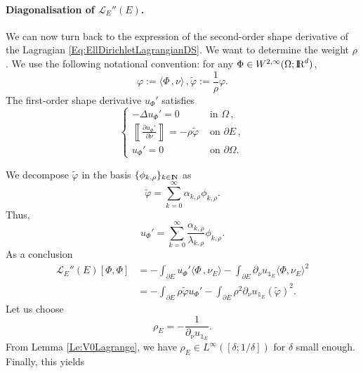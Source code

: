 \documentclass{article}
\newcommand{\R}{\textnormal{I\kern-0.21emR}}
\newcommand{\N}{\textnormal{I\kern-0.21emN}}
\def\O{{\Omega}}
\def\p{{\varphi}}
\numberwithin{equation}{section}
\begin{document}
\paragraph{Diagonalisation of $\mathscr L_{E}''(E)$.}
We can now turn back to the expression of the second-order shape derivative of the Lagragian \eqref{Eq:EllDirichletLagrangianDS}. We want to determine the weight $\rho$. We use the following notational convention: for any $\Phi \in W^{2,\infty}(\O;\R^d)$,
 \[\p:=\langle \Phi\,, \nu\rangle\,, \tilde\p:=\frac1{\rho} \p.\] The first-order shape derivative $u_\Phi'$ satisfies
\begin{equation}\label{Eq:Chop}
\begin{cases}
-\Delta u_\Phi'=0&\text{ in }\O\,, 
\\\left\llbracket\frac{\partial u_\Phi'}{\partial \nu}\right\rrbracket=-\rho \tilde \p&\text{ on }\partial E\,, 
\\ u_\Phi'=0&\text{ on }\partial \O.\end{cases}\end{equation} %
%
%

 We decompose $\tilde \p$ in the basis $\{\phi_{k,\rho}\}_{k\in \N}$ as
\begin{equation}
\tilde\p=\sum_{k=0}^\infty \alpha_{k,\rho} \phi_{k,\rho}.
\end{equation}
Thus, 
$$u_\Phi'=\sum_{k=0}^\infty\frac{\alpha_{k,\rho}}{\lambda_{k,\rho}} \phi_{k,\rho}.$$
As a conclusion
\begin{align*}
\mathscr L_{E}''(E)[\Phi,\Phi]&=-\int_{\partial E} u_\Phi'\langle \Phi\,, \nu_E\rangle
-\int_{\partial E}\partial_\nu u_{\mathds 1_E}\langle \Phi, \nu_E\rangle^2
\\&=-\int_{\partial E}\rho \tilde\p u_\Phi'
-\int_{\partial E}\rho^2\partial_\nu u_{\mathds 1_E}\left(\tilde \p\right)^2.
\end{align*}
Let us choose 
\[\rho_E=-\frac1{\partial_\nu u_{\mathds 1_E}}.\] From Lemma \ref{Le:V0Lagrange}, we have $\rho_E\in L^\infty([\delta;1/\delta])$ for $\delta$ small enough. Finally, this yields
\end{document}
